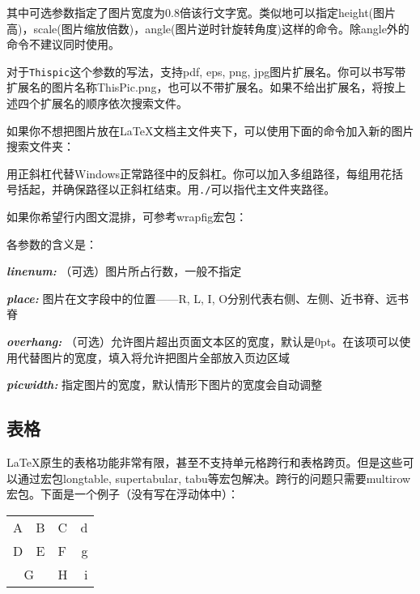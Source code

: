 {其中可选参数指定了图片宽度为0.8倍该行文字宽。类似地可以指定height(图片高)，scale(图片缩放倍数)，angle(图片逆时针旋转角度)这样的命令。除angle外的命令不建议同时使用。

对于\texttt{Thispic}这个参数的写法，\xelatex 支持pdf, eps, png, jpg图片扩展名。你可以书写带扩展名的图片名称ThisPic.png，也可以不带扩展名。如果不给出扩展名，将按上述四个扩展名的顺序依次搜索文件。\dpar

如果你不想把图片放在\LaTeX 文档主文件夹下，可以使用下面的命令加入新的图片搜索文件夹：
\begin{latex}{}
\graphicspath{c:/pics/}{./pic/}
\end{latex}

用正斜杠代替Windows正常路径中的反斜杠。你可以加入多组路径，每组用花括号括起，并确保路径以正斜杠结束。用\verb|./|可以指代主文件夹路径。\dpar

如果你希望行内图文混排，可参考wrapfig宏包：
\begin{latex}{}
\end{latex}

各参数的含义是：
\begin{inlinee}
\item {\bfseries\itshape linenum:} （可选）图片所占行数，一般不指定
\item {\bfseries\itshape place:} 图片在文字段中的位置——R, L, I, O分别代表右侧、左侧、近书脊、远书脊
\item {\bfseries\itshape overhang:} （可选）允许图片超出页面文本区的宽度，默认是0pt。在该项可以使用\latexline{\\width}代替图片的宽度，填入\latexline{\\width}将允许把图片全部放入页边区域
\item {\bfseries\itshape picwidth:} 指定图片的宽度，默认情形下图片的宽度会自动调整
\end{inlinee}

\subsection{表格}
\LaTeX 原生的表格功能非常有限，甚至不支持单元格跨行和表格跨页。但是这些可以通过宏包longtable, supertabular, tabu等宏包解决。跨行的问题只需要multirow宏包。下面是一个例子（没有写在浮动体中）：

\begin{codeshow}
\begin{center}
  \begin{tabular}[c]{|l|c||p{3em}
    r@{-}} \hline\hline
    A & B & C & d\\D & E & F & g\\
    \cline{1-2}
    \multicolumn{2}{|c|}{G}&H&i\\
    \hline
  \end{tabular}
\end{center}
\end{codeshow}

}
